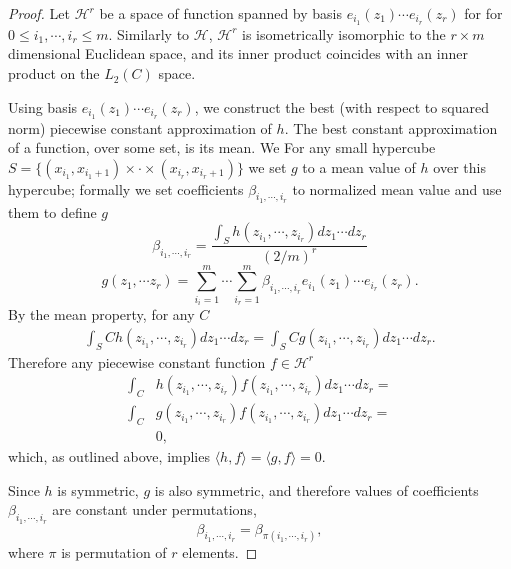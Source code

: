 \documentclass{article}
\begin{document}
\begin{proof}
Let $\mathcal H^r$ be a space of function spanned by basis $e_{i_1}(z_1) \cdots  e_{i_r}(z_r)$ for for $0\leq i_1,\cdots,i_r\leq m$. Similarly to $\mathcal{H}$, $\mathcal H^r$ is  isometrically isomorphic to  the $r \times m$ dimensional Euclidean space, and its inner product coincides with an inner product on the $L_2(C)$ space. 

Using basis $e_{i_1}(z_1) \cdots  e_{i_r}(z_r)$,  we construct the best (with respect to squared norm) piecewise  constant  approximation of $h$.  The best constant approximation of a function, over some set, is its mean. We  For any small hypercube $S =  \{ (x_{i_1},x_{i_1+1}) \times \cdot \times (x_{i_r},x_{i_r+1})\}$ we set $g$ to a mean value of $h$ over this hypercube; formally we set coefficients $\beta_{i_1,\cdots,i_r}$ to normalized mean value and use them to define $g$
\[
\beta_{i_1,\cdots,i_r} = \frac{ \int_{S} h(z_{i_1},\cdots,z_{i_r} ) dz_1 \cdots dz_r} { (2/m)^r} 
\]
\[
 g(z_1,\cdots z_r)= \sum_{i_i=1}^m \cdots \sum_{i_r=1}^m \beta_{i_1,\cdots,i_r} e_{i_1}(z_1) \cdots  e_{i_r}(z_r).
\]
By the mean property, for any $C$
\begin{align}
\int_{S} C h(z_{i_1},\cdots,z_{i_r} ) dz_1 \cdots dz_r= \int_{S} C g(z_{i_1},\cdots,z_{i_r} ) dz_1 \cdots dz_r.
\end{align}
Therefore any piecewise constant function $f \in \mathcal{H}^r$ 
\begin{align}
\int_{C}& h(z_{i_1},\cdots,z_{i_r}) f(z_{i_1},\cdots,z_{i_r}) dz_1 \cdots dz_r = \\
\int_{C}& g(z_{i_1},\cdots,z_{i_r}) f(z_{i_1},\cdots,z_{i_r})dz_1 \cdots dz_r=\\
&0, 
\end{align}
which, as outlined above, implies $\langle h,f \rangle = \langle g,f \rangle =0$. 


Since $h$ is symmetric, $g$ is also symmetric, and therefore values of coefficients $\beta_{i_1,\cdots,i_r}$ are constant under permutations,  
\[
 \beta_{i_1,\cdots,i_r} = \beta_{\pi(i_1,\cdots,i_r)},
\]
where $\pi$ is permutation of $r$ elements. 


\end{proof}
\end{document}
